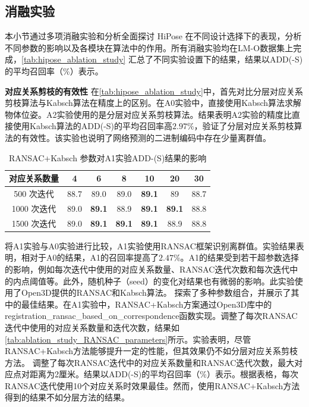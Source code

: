 \subsection{消融实验}

本小节通过多项消融实验和分析全面探讨 HiPose 在不同设计选择下的表现，分析不同参数的影响以及各模块在算法中的作用。所有消融实验均在LM-O数据集上完成，\autoref{tab:hipose_ablation_study} 汇总了不同实验设置下的结果，结果以ADD(-S)的平均召回率（\%）表示。



\textbf{对应关系剪枝的有效性 }
在\autoref{tab:hipose_ablation_study}中，首先对比分层对应关系剪枝算法与Kabsch算法在精度上的区别。在A0实验中，直接使用Kabsch算法求解物体位姿。A2实验使用的是分层对应关系剪枝算法。结果表明A2实验的精度比直接使用Kabsch算法的ADD(-S)的平均召回率高$2.97\%$，验证了分层对应关系剪枝算法的有效性。该实验也说明了网络预测的二进制编码中存在少量离群值。

\begin{table}[htbp]
  \centering
  \caption{RANSAC+Kabsch 参数对A1实验ADD-(S)结果的影响}
  \label{tab:ablation_study_RANSAC_parameters}
  \begin{tabular}{@{}c|c|c|c|c|c|c@{}}
    \toprule
    对应关系数量  & 4 & 6 & 8 & 10 & 20 & 30 \\
     \midrule
     500 次迭代 & 88.7 & 89.0 & 89.0	& \textbf{89.1} & 89 & 88.7 \\
     1000 次迭代 & 89.0 & \textbf{89.1} & 88.9 & \textbf{89.1} & \textbf{89.1} & 88.8 \\
     1500 次迭代 & 89.0 & \textbf{89.1} & \textbf{89.1} & \textbf{89.1} & 88.9 & 88.8 \\
    \bottomrule
  \end{tabular}
\end{table}

将A1实验与A0实验进行比较，A1实验使用RANSAC框架识别离群值。实验结果表明，相对于A0的结果，A1的召回率提高了$2.47\%$。A1的结果受到若干超参数选择的影响，例如每次迭代中使用的对应关系数量、RANSAC迭代次数和每次迭代中的内点阈值等。此外，随机种子（seed）的变化对结果也有微弱的影响。此实验使用了Open3D\cite{zhou2018open3d}提供的RANSAC和Kabsch算法。
探索了多种参数组合，并展示了其中的最佳结果。在A1实验中，RANSAC+Kabsch方案通过Open3D库中的registration\_ransac\_based\_on\_correspondence函数实现。调整了每次RANSAC迭代中使用的对应关系数量和迭代次数，结果如\autoref{tab:ablation_study_RANSAC_parameters}所示。实验表明，尽管RANSAC+Kabsch方法能够提升一定的性能，但其效果仍不如分层对应关系剪枝方法。
调整了每次RANSAC迭代中的对应关系数量和RANSAC迭代次数，最大对应点对距离为2厘米。结果以ADD(-S)的平均召回率（\%）表示。根据表格，每次RANSAC迭代使用10个对应关系时效果最佳。然而，使用RANSAC+Kabsch方法得到的结果不如分层方法的结果。

